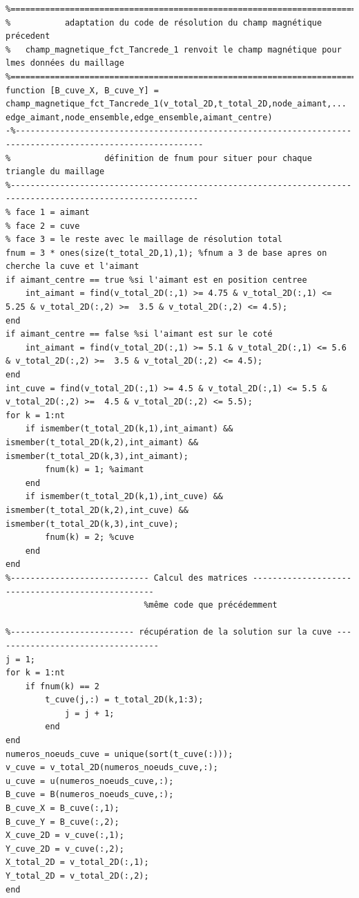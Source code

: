 \documentclass[a4paper,12pt,titlepage]{report}
\begin{document}
\begin{onehalfspace}
\begin{appendix}
\begin{verbatim}
%============================================================================================================
% 			adaptation du code de résolution du champ magnétique précedent
%	champ_magnetique_fct_Tancrede_1 renvoit le champ magnétique pour lmes données du maillage
%============================================================================================================
function [B_cuve_X, B_cuve_Y] = champ_magnetique_fct_Tancrede_1(v_total_2D,t_total_2D,node_aimant,...
edge_aimant,node_ensemble,edge_ensemble,aimant_centre)
-%------------------------------------------------------------------------------------------------------------
%                   définition de fnum pour situer pour chaque triangle du maillage 
%------------------------------------------------------------------------------------------------------------
% face 1 = aimant
% face 2 = cuve
% face 3 = le reste avec le maillage de résolution total
fnum = 3 * ones(size(t_total_2D,1),1); %fnum a 3 de base apres on cherche la cuve et l'aimant
if aimant_centre == true %si l'aimant est en position centree
    int_aimant = find(v_total_2D(:,1) >= 4.75 & v_total_2D(:,1) <= 5.25 & v_total_2D(:,2) >=  3.5 & v_total_2D(:,2) <= 4.5);
end
if aimant_centre == false %si l'aimant est sur le coté
    int_aimant = find(v_total_2D(:,1) >= 5.1 & v_total_2D(:,1) <= 5.6 & v_total_2D(:,2) >=  3.5 & v_total_2D(:,2) <= 4.5);
end
int_cuve = find(v_total_2D(:,1) >= 4.5 & v_total_2D(:,1) <= 5.5 & v_total_2D(:,2) >=  4.5 & v_total_2D(:,2) <= 5.5);
for k = 1:nt
	if ismember(t_total_2D(k,1),int_aimant) && ismember(t_total_2D(k,2),int_aimant) && ismember(t_total_2D(k,3),int_aimant);
    	fnum(k) = 1; %aimant
    end
   	if ismember(t_total_2D(k,1),int_cuve) && ismember(t_total_2D(k,2),int_cuve) && ismember(t_total_2D(k,3),int_cuve);
        fnum(k) = 2; %cuve
    end
end
%---------------------------- Calcul des matrices --------------------------------------------------
 							%même code que précédemment 

%------------------------- récupération de la solution sur la cuve ----------------------------------
j = 1;
for k = 1:nt
	if fnum(k) == 2
		t_cuve(j,:) = t_total_2D(k,1:3);
            j = j + 1;
        end
end
numeros_noeuds_cuve = unique(sort(t_cuve(:)));
v_cuve = v_total_2D(numeros_noeuds_cuve,:);
u_cuve = u(numeros_noeuds_cuve,:);
B_cuve = B(numeros_noeuds_cuve,:);
B_cuve_X = B_cuve(:,1);
B_cuve_Y = B_cuve(:,2);
X_cuve_2D = v_cuve(:,1);
Y_cuve_2D = v_cuve(:,2);
X_total_2D = v_total_2D(:,1);
Y_total_2D = v_total_2D(:,2);
end
\end{verbatim}


\end{appendix}
\end{onehalfspace}
\end{document}

